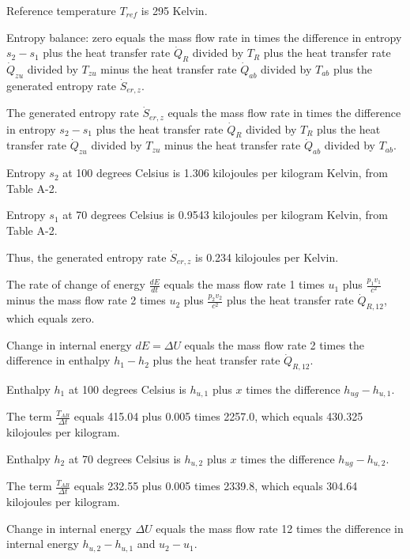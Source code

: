 Reference temperature \( T_{ref} \) is 295 Kelvin.

Entropy balance: zero equals the mass flow rate in times the difference in entropy \( s_2 - s_1 \) plus the heat transfer rate \( \dot{Q}_R \) divided by \( T_R \) plus the heat transfer rate \( \dot{Q}_{zu} \) divided by \( T_{zu} \) minus the heat transfer rate \( \dot{Q}_{ab} \) divided by \( T_{ab} \) plus the generated entropy rate \( \dot{S}_{er, z} \).

The generated entropy rate \( \dot{S}_{er, z} \) equals the mass flow rate in times the difference in entropy \( s_2 - s_1 \) plus the heat transfer rate \( \dot{Q}_R \) divided by \( T_R \) plus the heat transfer rate \( \dot{Q}_{zu} \) divided by \( T_{zu} \) minus the heat transfer rate \( \dot{Q}_{ab} \) divided by \( T_{ab} \).

Entropy \( s_2 \) at 100 degrees Celsius is 1.306 kilojoules per kilogram Kelvin, from Table A-2.

Entropy \( s_1 \) at 70 degrees Celsius is 0.9543 kilojoules per kilogram Kelvin, from Table A-2.

Thus, the generated entropy rate \( \dot{S}_{er, z} \) is 0.234 kilojoules per Kelvin.

The rate of change of energy \( \frac{dE}{dt} \) equals the mass flow rate 1 times \( u_1 \) plus \( \frac{p_1 v_1}{c^2} \) minus the mass flow rate 2 times \( u_2 \) plus \( \frac{p_2 v_2}{c^2} \) plus the heat transfer rate \( \dot{Q}_{R,12} \), which equals zero.

Change in internal energy \( dE = \Delta U \) equals the mass flow rate 2 times the difference in enthalpy \( h_1 - h_2 \) plus the heat transfer rate \( \dot{Q}_{R,12} \).

Enthalpy \( h_1 \) at 100 degrees Celsius is \( h_{u,1} \) plus \( x \) times the difference \( h_{ug} - h_{u,1} \).

The term \( \frac{T_{AB}}{\Delta t} \) equals 415.04 plus 0.005 times 2257.0, which equals 430.325 kilojoules per kilogram.

Enthalpy \( h_2 \) at 70 degrees Celsius is \( h_{u,2} \) plus \( x \) times the difference \( h_{ug} - h_{u,2} \).

The term \( \frac{T_{AB}}{\Delta t} \) equals 232.55 plus 0.005 times 2339.8, which equals 304.64 kilojoules per kilogram.

Change in internal energy \( \Delta U \) equals the mass flow rate 12 times the difference in internal energy \( h_{u,2} - h_{u,1} \) and \( u_2 - u_1 \).

